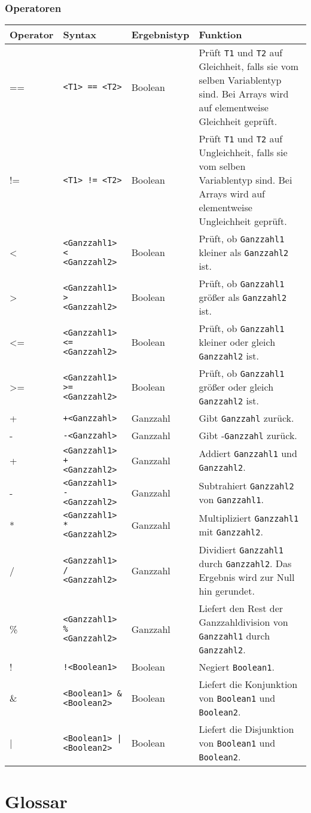 \documentclass[a4paper,10pt]{article}
\begin{document}
\subsubsection{Operatoren}
\begin{tabularx}{\textwidth}{| l | l | l | X |}
\hline
\textbf{Operator} & \textbf{Syntax} & \textbf{Ergebnistyp} & \textbf{Funktion}\\
\hline
== & \texttt{<T1> == <T2>} & Boolean & Prüft \texttt{T1} und \texttt{T2} auf Gleichheit, falls sie vom selben Variablentyp sind. Bei Arrays wird auf elementweise Gleichheit geprüft.\\
!= & \texttt{<T1> != <T2>} & Boolean & Prüft \texttt{T1} und \texttt{T2} auf Ungleichheit, falls sie vom selben Variablentyp sind. Bei Arrays wird auf elementweise Ungleichheit geprüft.\\
\hline
< & \texttt{<Ganzzahl1> < <Ganzzahl2>} & Boolean & Prüft, ob \texttt{Ganzzahl1} kleiner als \texttt{Ganzzahl2} ist.\\
> & \texttt{<Ganzzahl1> > <Ganzzahl2>} & Boolean & Prüft, ob \texttt{Ganzzahl1} größer als \texttt{Ganzzahl2} ist.\\
<= & \texttt{<Ganzzahl1> <= <Ganzzahl2>} & Boolean & Prüft, ob \texttt{Ganzzahl1} kleiner oder gleich \texttt{Ganzzahl2} ist.\\
>= & \texttt{<Ganzzahl1> >= <Ganzzahl2>} & Boolean & Prüft, ob \texttt{Ganzzahl1} größer oder gleich \texttt{Ganzzahl2} ist.\\
+ & \texttt{+<Ganzzahl>} & Ganzzahl & Gibt \texttt{Ganzzahl} zurück.\\
- & \texttt{-<Ganzzahl>} & Ganzzahl & Gibt -\texttt{Ganzzahl} zurück.\\
+ & \texttt{<Ganzzahl1> + <Ganzzahl2>} & Ganzzahl & Addiert \texttt{Ganzzahl1} und \texttt{Ganzzahl2}.\\
- & \texttt{<Ganzzahl1> - <Ganzzahl2>} & Ganzzahl & Subtrahiert \texttt{Ganzzahl2} von \texttt{Ganzzahl1}.\\
* & \texttt{<Ganzzahl1> * <Ganzzahl2>} & Ganzzahl & Multipliziert \texttt{Ganzzahl1} mit \texttt{Ganzzahl2}.\\
/ & \texttt{<Ganzzahl1> / <Ganzzahl2>} & Ganzzahl & Dividiert \texttt{Ganzzahl1} durch \texttt{Ganzzahl2}. Das Ergebnis wird zur Null hin gerundet.\\
\% & \texttt{<Ganzzahl1> \% <Ganzzahl2>} & Ganzzahl & Liefert den Rest der Ganzzahldivision von \texttt{Ganzzahl1} durch \texttt{Ganzzahl2}.\\
\hline
! & \texttt{!<Boolean1>} & Boolean & Negiert \texttt{Boolean1}.\\
\& & \texttt{<Boolean1> \& <Boolean2>} & Boolean & Liefert die Konjunktion von \texttt{Boolean1} und \texttt{Boolean2}.\\
| & \texttt{<Boolean1> | <Boolean2>} & Boolean & Liefert die Disjunktion von \texttt{Boolean1} und \texttt{Boolean2}.\\
\hline
\end{tabularx}

\section{Glossar}
\end{document}
